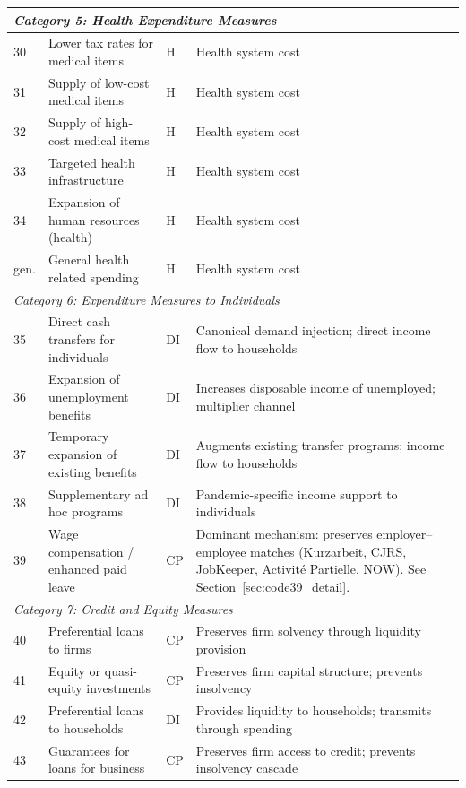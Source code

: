 \documentclass[12pt]{article}
\begin{document}
\begin{small}
\begin{longtable}{p{0.6cm} p{5.8cm} p{1.2cm} p{5.5cm}}
\multicolumn{4}{l}{\textit{Category 5: Health Expenditure Measures}} \\
\midrule
30 & Lower tax rates for medical items & H & Health system cost \\
31 & Supply of low-cost medical items & H & Health system cost \\
32 & Supply of high-cost medical items & H & Health system cost \\
33 & Targeted health infrastructure & H & Health system cost \\
34 & Expansion of human resources (health) & H & Health system cost \\
gen. & General health related spending & H & Health system cost \\
\midrule

\multicolumn{4}{l}{\textit{Category 6: Expenditure Measures to Individuals}} \\
\midrule
35 & Direct cash transfers for individuals & DI & Canonical demand injection; direct income flow to households \\
36 & Expansion of unemployment benefits & DI & Increases disposable income of unemployed; multiplier channel \\
37 & Temporary expansion of existing benefits & DI & Augments existing transfer programs; income flow to households \\
38 & Supplementary ad hoc programs & DI & Pandemic-specific income support to individuals \\
39 & Wage compensation / enhanced paid leave & CP & Dominant mechanism: preserves employer--employee matches (Kurzarbeit, CJRS, JobKeeper, Activit\'{e} Partielle, NOW). See Section~\ref{sec:code39_detail}. \\
\midrule

\multicolumn{4}{l}{\textit{Category 7: Credit and Equity Measures}} \\
\midrule
40 & Preferential loans to firms & CP & Preserves firm solvency through liquidity provision \\
41 & Equity or quasi-equity investments & CP & Preserves firm capital structure; prevents insolvency \\
42 & Preferential loans to households & DI & Provides liquidity to households; transmits through spending \\
43 & Guarantees for loans for business & CP & Preserves firm access to credit; prevents insolvency cascade \\
\midrule


\end{longtable}
\end{small}
\end{document}
